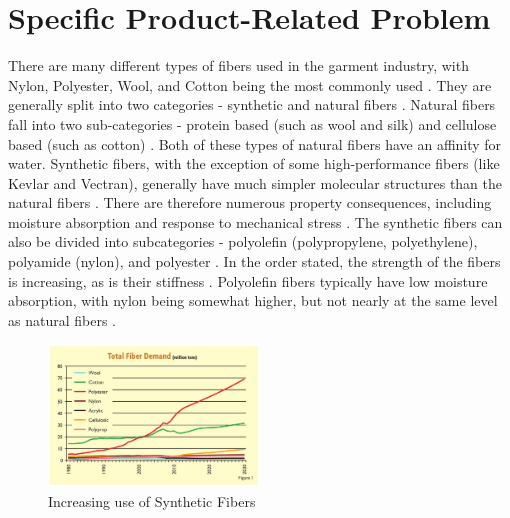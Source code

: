 \documentclass{article}
\begin{document}
\section{Specific Product-Related Problem}
There are many different types of fibers used in the garment industry, with Nylon, Polyester, Wool, and Cotton being the most commonly used \autocite{naturalfiberreview}. They are generally split into two categories - synthetic and natural fibers \autocite{naturalfiberreview}\autocite{comparisonsyntheticfibers}. Natural fibers fall into two sub-categories - protein based (such as wool and silk) and cellulose based (such as cotton) \autocite{comparisonsyntheticfibers}. Both of these types of natural fibers have an affinity for water. Synthetic fibers, with the exception of some high-performance fibers (like Kevlar and Vectran), generally have much simpler molecular structures than the natural fibers \autocite{comparisonsyntheticfibers}. There are therefore numerous property consequences, including moisture absorption and response to mechanical stress \autocite{polyesterstrength}. The synthetic fibers can also be divided into subcategories - polyolefin (polypropylene, polyethylene), polyamide (nylon), and polyester \autocite{comparisonsyntheticfibers}. In the order stated, the strength of the fibers is increasing, as is their stiffness \autocite{polyesterstrength}. Polyolefin fibers typically have low moisture absorption, with nylon being somewhat higher, but not nearly at the same level as natural fibers \autocite{naturalfibercompositereview}.

\begin{figure}
  \centering
  \includegraphics[width=0.5\textwidth]{assets/polyester_rise.jpg}
  \caption{Increasing use of Synthetic Fibers \protect\autocite{globaltradeanalysis}}
  \label{fig:syntheticfiberuse}
\end{figure}
\end{document}
